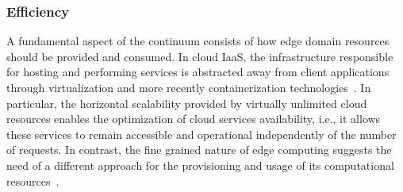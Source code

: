 
\subsubsection{Efficiency}

A fundamental aspect of the continuum consists of how edge domain resources should be provided and consumed. In cloud IaaS, the infrastructure responsible for hosting and performing services is abstracted away from client applications through virtualization and more recently containerization technologies~\cite{Quatrocchi2016discrete}. In particular, the horizontal scalability provided by virtually unlimited cloud resources enables the optimization of cloud services availability, i.e., it allows these services to remain accessible and operational independently of the number of requests. In contrast, the fine grained nature of edge computing suggests the need of a different approach for the provisioning and usage of its computational resources~\cite{GarrigaMendonca2017}.



